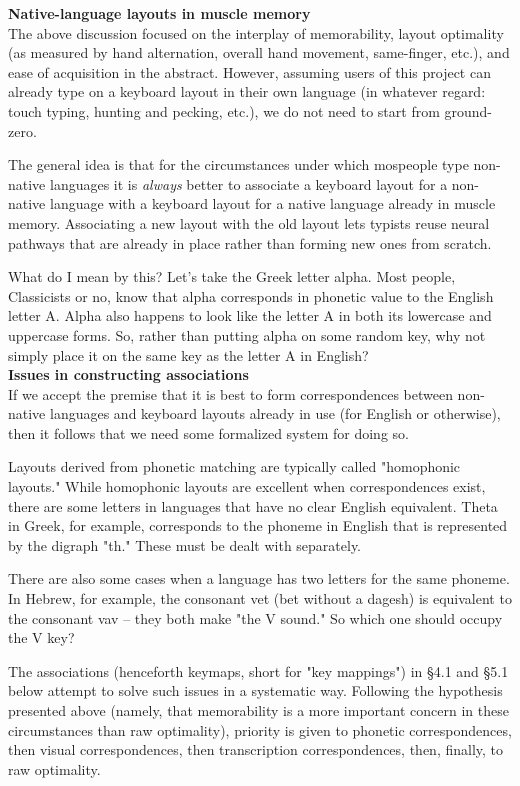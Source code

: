 \documentclass[11pt]{article}
\begin{document}
\noindent \textbf{Native-language layouts in muscle memory} \\

The above discussion focused on the interplay of memorability, layout optimality (as measured by hand alternation, overall hand movement, same-finger, etc.), and ease of acquisition in the abstract. However, assuming users of this project can already type on a keyboard layout in their own language (in whatever regard: touch typing, hunting and pecking, etc.), we do not need to start from ground-zero.

The general idea is that for the circumstances under which mospeople type non-native languages it is \emph{always} better to associate a keyboard layout for a non-native language with a keyboard layout for a native language already in muscle memory. Associating a new layout with the old layout lets typists reuse neural pathways that are already in place rather than forming new ones from scratch.

What do I mean by this? Let's take the Greek letter alpha. Most people, Classicists or no, know that alpha corresponds in phonetic value to the English letter A. Alpha also happens to look like the letter A in both its lowercase and uppercase forms. So, rather than putting alpha on some random key, why not simply place it on the same key as the letter A in English? \\

\noindent \textbf{Issues in constructing associations} \\

If we accept the premise that it is best to form correspondences between non-native languages and keyboard layouts already in use (for English or otherwise), then it follows that we need some formalized system for doing so.

Layouts derived from phonetic matching are typically called "homophonic layouts." While homophonic layouts are excellent when correspondences exist, there are some letters in languages that have no clear English equivalent. Theta in Greek, for example, corresponds to the phoneme in English that is represented by the digraph "th." These must be dealt with separately.

There are also some cases when a language has two letters for the same phoneme. In Hebrew, for example, the consonant vet (bet without a dagesh) is equivalent to the consonant vav -- they both make "the V sound." So which one should occupy the V key?

The associations (henceforth keymaps, short for "key mappings") in §4.1 and §5.1 below attempt to solve such issues in a systematic way. Following the hypothesis presented above (namely, that memorability is a more important concern in these circumstances than raw optimality), priority is given to phonetic correspondences, then visual correspondences, then transcription correspondences, then, finally, to raw optimality.
\end{document}

